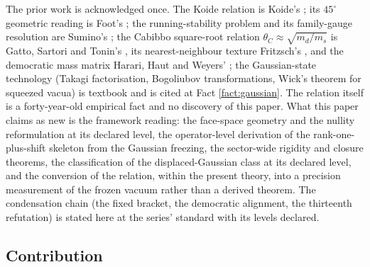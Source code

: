 \documentclass[11pt]{article}
\theoremstyle{definition}
\begin{document}
The prior work is acknowledged once. The Koide relation is Koide's \cite{Koide1982}; its $45^{\circ}$ geometric reading is Foot's \cite{Foot1994}; the running-stability problem and its family-gauge resolution are Sumino's \cite{Sumino2009}; the Cabibbo square-root relation $\theta_{C} \approx \sqrt{m_{d}/m_{s}}$ is Gatto, Sartori and Tonin's \cite{GST1968}, its nearest-neighbour texture Fritzsch's \cite{Fritzsch1978}, and the democratic mass matrix Harari, Haut and Weyers' \cite{HHW1978}; the Gaussian-state technology (Takagi factorisation, Bogoliubov transformations, Wick's theorem for squeezed vacua) is textbook and is cited at Fact \ref{fact:gaussian}. The relation itself is a forty-year-old empirical fact and no discovery of this paper. What this paper claims as new is the framework reading: the face-space geometry and the nullity reformulation at its declared level, the operator-level derivation of the rank-one-plus-shift skeleton from the Gaussian freezing, the sector-wide rigidity and closure theorems, the classification of the displaced-Gaussian class at its declared level, and the conversion of the relation, within the present theory, into a precision measurement of the frozen vacuum rather than a derived theorem. The condensation chain (the fixed bracket, the democratic alignment, the thirteenth refutation) is stated here at the series' standard with its levels declared.

\subsection*{Contribution}
\end{document}
